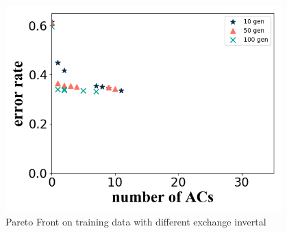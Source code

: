 \documentclass[conference]{IEEEtran}
\begin{document}
\begin{figure}[H]
\begin{minipage}[t]{0.25\textwidth}
    \includegraphics[width=0.95\textwidth]{figures/diffGenTrain3.png}
    \end{minipage}
    \caption{Pareto Front on training data with different exchange invertal}
    \label{diffGenTr}
  \end{figure}
\end{document}
